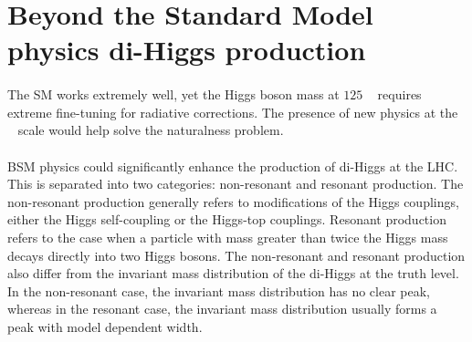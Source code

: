 \section{Beyond the Standard Model physics di-Higgs production}
\paragraph{}
The SM works extremely well, yet the Higgs boson mass at $125$ \GeV~ requires extreme fine-tuning for radiative corrections. The presence of new physics at the \TeV~ scale would help solve the naturalness problem.

\paragraph{}
BSM physics could significantly enhance the production of di-Higgs at the LHC. This is separated into two categories: non-resonant and resonant production. 
The non-resonant production generally refers to modifications of the Higgs couplings, either the Higgs self-coupling or the Higgs-top couplings. 
Resonant production refers to the case when a particle with mass greater than twice the Higgs mass decays directly into two Higgs bosons. 
The non-resonant and resonant production also differ from the invariant mass distribution of the di-Higgs at the truth level. 
In the non-resonant case, the invariant mass distribution has no clear peak, whereas in the resonant case, the invariant mass distribution usually forms a peak with model dependent width. 

